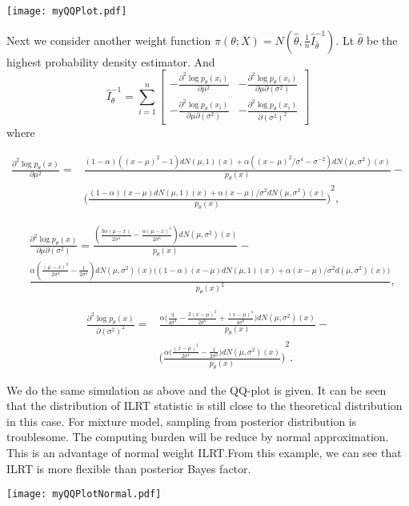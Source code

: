 \texttt{[image: myQQPlot.pdf]}


Next we consider another weight function $\pi (\theta; X)= N(\hat{\theta},\frac{1}{n}\hat{I}^{-1}_{\hat{\theta}})$. Lt $\hat{\theta}$ be the highest probability density estimator. And 
$$\hat{I}_\theta^{-1}=\sum_{i=1}^n
\begin{bmatrix}
-\frac{\partial^2 \log p_\theta(x_i)}{\partial \mu^2}&
    -\frac{\partial^2 \log p_\theta(x_i)}{\partial \mu\partial (\sigma^2)}
\\
    -\frac{\partial^2 \log p_\theta(x_i)}{\partial \mu\partial (\sigma^2)}
    &
    -\frac{\partial^2 \log p_\theta(x_i)}{\partial {(\sigma^2)}^2}
\end{bmatrix}$$
where

\begin{equation}
    \begin{aligned}
\frac{\partial^2 \log p_\theta(x)}{\partial
        \mu^2}=&
        \frac{(1-\alpha)({(x-\mu)}^2-1)dN(\mu,1)(x)+\alpha ({(x-\mu)}^2/\sigma^4 -\sigma^{-2})dN(\mu,\sigma^2)(x)}{p_\theta (x)}-\\
        &
        {\Big(\frac{(1-\alpha)(x-\mu)dN(\mu,1)(x)+\alpha(x-\mu)/\sigma^2 dN(\mu,\sigma^2)(x)}{p_\theta(x)}\Big)}^2,
    \end{aligned}
\end{equation}

\begin{equation}
    \begin{aligned}
        &\frac{\partial^2 \log p_\theta(x)}{\partial
        \mu\partial(\sigma^2)}=
        \frac{(\frac{3\alpha(\mu-x)}{2\sigma^4}-\frac{\alpha {(\mu-x)}^3}{2\sigma^6})dN(\mu,\sigma^2)(x)}{p_\theta (x)}-\\
        &
        \frac{\alpha (\frac{{(\mu-x)}^2}{2\sigma^4}-\frac{1}{2\sigma^2})dN(\mu,\sigma^2)(x)\big((1-\alpha)(x-\mu)dN(\mu,1)(x)+\alpha(x-\mu)/\sigma^2 d(\mu,\sigma^2)(x)\big)}{p_{\theta}{(x)}^2},
    \end{aligned}
\end{equation}


\begin{equation}
    \begin{aligned}
\frac{\partial^2 \log p_\theta(x)}{\partial
        {(\sigma^2)}^2}=&
        \frac{\alpha \big(\frac{3}{4\sigma^4}-\frac{3{(x-\mu)}^2}{2\sigma^6} +\frac{{(x-\mu)}^4}{4\sigma^8}\big)dN(\mu,\sigma^2)(x)}{p_\theta (x)}-\\
        &
        {\Big(\frac{\alpha\big(\frac{{(x-\mu)}^2}{2\sigma^4}-\frac{1}{2\sigma^2} \big)dN(\mu,\sigma^2)(x)}{p_\theta(x)}\Big)}^2.
    \end{aligned}
\end{equation}

We do the same simulation as above and the QQ-plot is given.
It  can be seen that the distribution of ILRT statistic is still close to the theoretical distribution in this case.
For mixture model, sampling from posterior distribution is troublesome.
The computing burden will be reduce by normal approximation.
This is an advantage of normal weight ILRT.\@ From this example, we can see that ILRT is more flexible than posterior Bayes factor.


\texttt{[image: myQQPlotNormal.pdf]}


